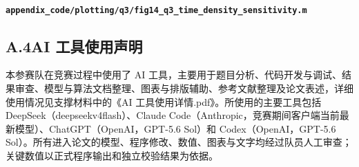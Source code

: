 
\paragraph{\nolinkurl{appendix_code/plotting/q3/fig14_q3_time_density_sensitivity.m}}


\subsection*{A.4\quad AI 工具使用声明}

本参赛队在竞赛过程中使用了 AI 工具，主要用于题目分析、代码开发与调试、结果审查、模型与算法文档整理、图表与排版辅助、参考文献整理及论文表述，详细使用情况见支撑材料中的《AI 工具使用详情.pdf》。所使用的主要工具包括 DeepSeek（deepseekv4flash）、Claude Code（Anthropic，竞赛期间客户端当前最新模型）、ChatGPT（OpenAI，GPT-5.6 Sol）和 Codex（OpenAI，GPT-5.6 Sol）。所有进入论文的模型、程序修改、数值、图表与文字均经过队员人工审查；关键数值以正式程序输出和独立校验结果为依据。
